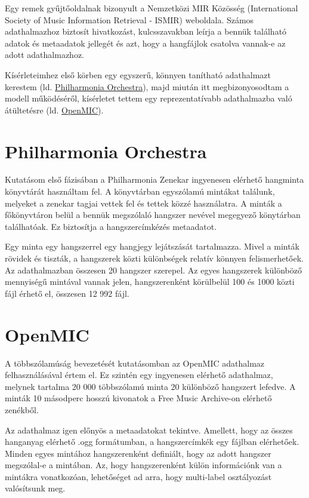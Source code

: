 Egy remek gyűjtőoldalnak bizonyult a Nemzetközi MIR Közösség (International Society of Music Information Retrieval - ISMIR) weboldala. Számos adathalmazhoz biztosít hivatkozást, kulcsszavakban leírja a bennük található adatok és metaadatok jellegét és azt, hogy a hangfájlok csatolva vannak-e az adott adathalmazhoz. \cite{ismirdataset}

Kísérleteimhez első körben egy egyszerű, könnyen tanítható adathalmazt kerestem (ld. \hyperref[sec:Philharmonia]{Philharmonia Orchestra}), majd miután itt megbizonyosodtam a modell működéséről, kísérletet tettem egy reprezentatívabb adathalmazba való átültetésre (ld. \hyperref[sec:OpenMIC]{OpenMIC}).

\section{Philharmonia Orchestra}
\label{sec:Philharmonia}

Kutatásom első fázisában a Philharmonia Zenekar ingyenesen elérhető hangminta könyvtárát használtam fel. A könyvtárban egyszólamú mintákat találunk, melyeket a zenekar tagjai vettek fel és tettek közzé használatra. A minták a főkönyvtáron belül a bennük megszólaló hangszer nevével megegyező könytárban találhatóak. Ez biztosítja a hangszercímkézés metaadatot.

Egy minta egy hangszerrel egy hangjegy lejátszását tartalmazza. Mivel a minták rövidek és tiszták, a hangszerek közti különbségek relatív könnyen felismerhetőek. Az adathalmazban összesen 20 hangszer szerepel. Az egyes hangszerek különböző mennyiségű mintával vannak jelen, hangszerenként körülbelül 100 és 1000 közti fájl érhető el, összesen 12 992 fájl.

\section{OpenMIC}
\label{sec:OpenMIC}

A többszólamúság bevezetését kutatásomban az OpenMIC \cite{humphrey2018openmic} adathalmaz felhasználásával értem el. Ez szintén egy ingyenesen elérhető adathalmaz, melynek tartalma 20 000 többszólamú minta 20 különböző hangszert lefedve. A minták 10 másodperc hosszú kivonatok a Free Music Archive-on \cite{fma2016} elérhető zenékből. \cite{humphrey2018openmic}

Az adathalmaz igen előnyös a metaadatokat tekintve. Amellett, hogy az összes hanganyag elérhető .ogg formátumban, a hangszercímkék egy fájlban elérhetőek. Minden egyes mintához hangszerenként definiált, hogy az adott hangszer megszólal-e a mintában. Az, hogy hangszerenként külön információnk van a mintákra vonatkozóan, lehetőséget ad arra, hogy multi-label osztályozást valósítsunk meg. \cite{humphrey2018openmic}

